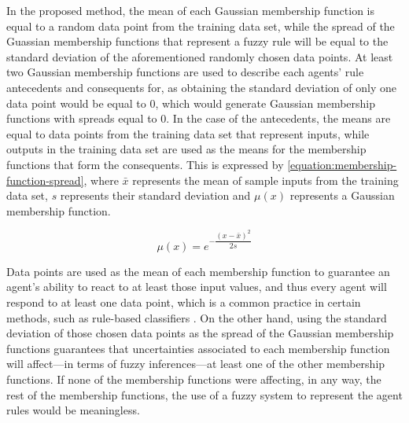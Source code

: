 ﻿\documentclass{ieeeaccess}
\begin{document}
In the proposed method, the mean of each Gaussian
membership function is equal to a random data point from the training data set,
while the spread of the Guassian membership functions that represent a fuzzy
rule will be equal to the standard deviation of the aforementioned
randomly chosen data points. At least two Gaussian membership
functions are used to describe each agents' rule antecedents and
consequents for, as obtaining the standard deviation of only one data
point would be equal to 0, which would generate Gaussian membership
functions with spreads equal to 0.
In the case of the antecedents, the means are equal to data points
from the training data set that represent inputs, while outputs in the
training data set are used as the means for the membership functions
that form the consequents. This is expressed by
\ref{equation:membership-function-spread}, where $\bar{x}$ represents
the mean of sample inputs from the training data set, $s$ represents
their standard deviation and $\mu(x)$ represents a Gaussian membership
function.

\begin{equation}
  \label{equation:membership-function-spread}
  \mu(x) = e^{-\dfrac{(x - \bar{x})^{2}}{2 s}}
\end{equation}


Data points are used as the mean of each membership function to
guarantee an agent's ability to react to at least those input
values, and thus every agent will respond to at least one data point,
which is a common practice in certain methods, such as rule-based
classifiers \cite{zhao2009building} \cite{almutairi2018rule}. On the
other hand, using the standard deviation of those chosen data points
as the spread of the Gaussian membership functions guarantees that
uncertainties associated to each membership function will affect---in
terms of fuzzy inferences---at least one of the other membership
functions. If none of the membership functions were affecting, in any
way, the rest of the membership functions, the use of a fuzzy system to
represent the agent rules would be meaningless. 
\end{document}
